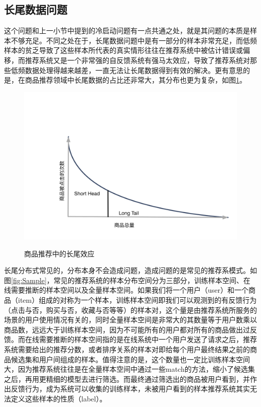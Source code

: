 \subsection{长尾数据问题}
这个问题和上一小节中提到的冷启动问题有一点共通之处，就是其问题的本质是样本不够充足。不同之处在于，长尾数据问题中是有一部分的样本非常充足，而低频样本的贫乏导致了这些样本所代表的真实情形往往在推荐系统中被估计错误或偏移，而推荐系统又是一个非常强的自反馈系统有强马太效应，导致了推荐系统对那些低频数据处理得越来越差，一直无法让长尾数据得到有效的解决。更有意思的是，在商品推荐领域中长尾数据的占比还非常大，其分布也更为复杂，如图\ref{fig:LongTail}。
\begin{figure}[!h]
\centering
  \includegraphics[width=1.0\textwidth]{./graph/LongTail.png}\\
  \caption{商品推荐中的长尾效应}
\label{fig:LongTail}
\end{figure}

长尾分布式常见的，分布本身不会造成问题，造成问题的是常见的推荐系模式。如图\ref{fig:Sample}，常见的推荐系统的样本分布空间分为三部分，训练样本空间、在线需要推断的样本空间以及全量样本空间。如果我们将一个用户（user）和一个商品（item）组成的对称为一个样本，训练样本空间即我们可以观测到的有反馈行为（点击与否，购买与否，收藏与否等等）的样本对，这个量是由推荐系统所服务的场景的用户使用情况有关的，同时全量样本空间是非常大的其数量等于用户数乘以商品数，远远大于训练样本空间，因为不可能所有的用户都对所有的商品做出过反馈。而在线需要推断的样本空间指的是在线系统中一个用户发送了请求之后，推荐系统需要给出的推荐分数，或者排序关系的样本对即给每个用户最终结果之前的商品候选集和用户间组成的样本。值得注意的是，这个数量也一定比训练样本空间大，因为推荐系统往往是在全量样本空间中通过一些match的方法，缩小了候选集之后，再用更精细的模型去进行筛选。而最终通过筛选出的商品被用户看到，并作出反馈行为，成为系统可以收集的训练样本，未被用户看到的样本推荐系统其实无法定义这些样本的性质（label）。


